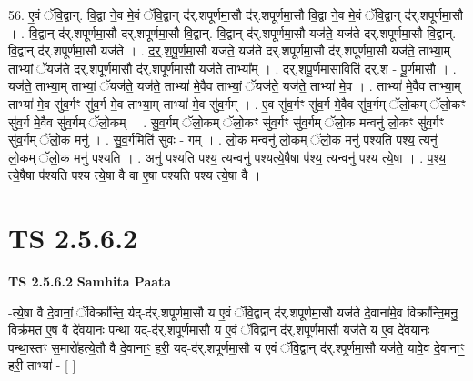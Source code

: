 \documentclass[17pt]{extarticle}
\begin{document}
56. ए॒वं ॅवि॒द्वान्. वि॒द्वा ने॒व मे॒वं ॅवि॒द्वान् द॑र्.शपूर्णमा॒सौ द॑र्.शपूर्णमा॒सौ वि॒द्वा ने॒व मे॒वं ॅवि॒द्वान् द॑र्.शपूर्णमा॒सौ । . वि॒द्वान् द॑र्.शपूर्णमा॒सौ द॑र्.शपूर्णमा॒सौ वि॒द्वान्. वि॒द्वान् द॑र्.शपूर्णमा॒सौ यज॑ते॒ यज॑ते दर्.शपूर्णमा॒सौ वि॒द्वान्. वि॒द्वान् द॑र्.शपूर्णमा॒सौ यज॑ते । . द॒र्॒.श॒पू॒र्ण॒मा॒सौ यज॑ते॒ यज॑ते दर्.शपूर्णमा॒सौ द॑र्.शपूर्णमा॒सौ यज॑ते॒ ताभ्या॒म् ताभ्यां॒ ॅयज॑ते दर्.शपूर्णमा॒सौ द॑र्.शपूर्णमा॒सौ यज॑ते॒ ताभ्या᳚म् । . द॒र्॒.श॒पू॒र्ण॒मा॒साविति॑ दर्.श - पू॒र्ण॒मा॒सौ । . यज॑ते॒ ताभ्या॒म् ताभ्यां॒ ॅयज॑ते॒ यज॑ते॒ ताभ्या॑ मे॒वैव ताभ्यां॒ ॅयज॑ते॒ यज॑ते॒ ताभ्या॑ मे॒व । . ताभ्या॑ मे॒वैव ताभ्या॒म् ताभ्या॑ मे॒व सु॑व॒र्गꣳ सु॑व॒र्ग मे॒व ताभ्या॒म् ताभ्या॑ मे॒व सु॑व॒र्गम् । . ए॒व सु॑व॒र्गꣳ सु॑व॒र्ग मे॒वैव सु॑व॒र्गम् ॅलो॒कम् ॅलो॒कꣳ सु॑व॒र्ग मे॒वैव सु॑व॒र्गम् ॅलो॒कम् । . सु॒व॒र्गम् ॅलो॒कम् ॅलो॒कꣳ सु॑व॒र्गꣳ सु॑व॒र्गम् ॅलो॒क मन्वनु॑ लो॒कꣳ सु॑व॒र्गꣳ सु॑व॒र्गम् ॅलो॒क मनु॑ । . सु॒व॒र्गमिति॑ सुवः - गम् । . लो॒क मन्वनु॑ लो॒कम् ॅलो॒क मनु॑ पश्यति पश्य॒ त्यनु॑ लो॒कम् ॅलो॒क मनु॑ पश्यति । . अनु॑ पश्यति पश्य॒ त्यन्वनु॑ पश्यत्ये॒षैषा प॑श्य॒ त्यन्वनु॑ पश्य त्ये॒षा । . प॒श्य॒ त्ये॒षैषा प॑श्यति पश्य त्ये॒षा वै वा ए॒षा प॑श्यति पश्य त्ये॒षा वै । \newline
\pagebreak
{}

\section{ TS 2.5.6.2 }

\textbf{TS 2.5.6.2 } \newline
\textbf{Samhita Paata} \newline

-त्ये॒षा वै दे॒वानां॒ ॅविक्रा᳚न्ति॒ र्यद्-द॑र्.शपूर्णमा॒सौ य ए॒वं ॅवि॒द्वान् द॑र्.शपूर्णमा॒सौ यज॑ते दे॒वाना॑मे॒व विक्रा᳚न्ति॒मनु॒ विक्र॑मत ए॒ष वै दे॑व॒यानः॒ पन्था॒ यद्-द॑र्.शपूर्णमा॒सौ य ए॒वं ॅवि॒द्वान् द॑र्.शपूर्णमा॒सौ यज॑ते॒ य ए॒व दे॑व॒यानः॒ पन्था॒स्तꣳ स॒मारो॑हत्ये॒तौ वै दे॒वानाꣳ॒॒ हरी॒ यद्-द॑र्.शपूर्णमा॒सौ य ए॒वं ॅवि॒द्वान् द॑र्.श्पूर्णमा॒सौ यज॑ते॒ यावे॒व दे॒वानाꣳ॒॒ हरी॒ ताभ्या॑ - [  ] \newline
\end{document}

